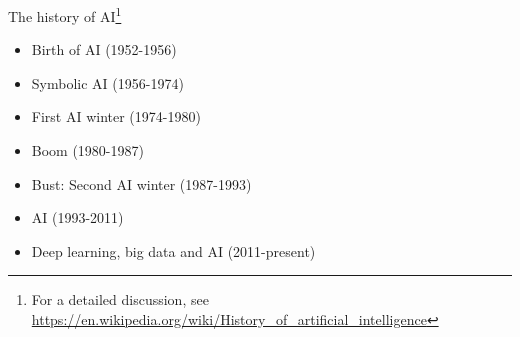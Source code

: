 \begin{frame}{The history of AI\footnote{
\tiny For a detailed discussion, see \url{https://en.wikipedia.org/wiki/History_of_artificial_intelligence}}}

\begin{itemize}
\item Birth of AI (1952-1956)
\item Symbolic AI (1956-1974)
\item First AI winter (1974-1980)
\item Boom (1980-1987)
\item Bust: Second AI winter (1987-1993)
\item AI (1993-2011)
\item Deep learning, big data and AI (2011-present)

\end{itemize}

\end{frame}

